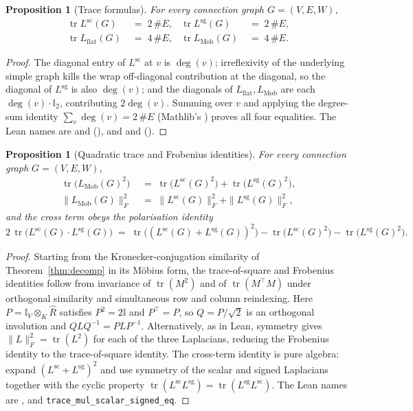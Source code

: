 \documentclass[11pt,a4paper]{amsart}
\theoremstyle{plain}
\newtheorem{proposition}[theorem]{Proposition}
\theoremstyle{definition}
\theoremstyle{remark}
\DeclareMathOperator{\tr}{tr}
\newcommand{\II}{\mathbb{I}}
\newcommand{\kronprod}{\otimes_{\!K}}
\newcommand{\Lscalar}{L^{\operatorname{sc}}}
\newcommand{\Lsigned}{L^{\operatorname{sg}}}
\begin{document}
\begin{proposition}[Trace formulas]\label{prop:traces}
For every connection graph $G=(V,E,W)$,
\begin{align*}
  \tr \Lscalar(G) \;&=\; 2\,\#E, &
  \tr \Lsigned(G) \;&=\; 2\,\#E, \\
  \tr L_{\mathrm{flat}}(G) \;&=\; 4\,\#E, &
  \tr L_{\mathrm{Mob}}(G) \;&=\; 4\,\#E.
\end{align*}
\end{proposition}

\begin{proof}
The diagonal entry of $\Lscalar$ at $v$ is
$\deg(v)$; irreflexivity of the underlying simple graph kills the
wrap off-diagonal contribution at the diagonal, so the diagonal of
$\Lsigned$ is also $\deg(v)$; and the diagonals of
$L_{\mathrm{flat}}, L_{\mathrm{Mob}}$ are each $\deg(v)\cdot\II_2$,
contributing $2\deg(v)$. Summing over $v$ and applying the
degree-sum identity
$\sum_v \deg(v) = 2\,\#E$
(Mathlib's
) proves
all four equalities. The Lean names are
 and 
(), and  and
 ().
\end{proof}

\begin{proposition}[Quadratic trace and Frobenius
identities]\label{prop:traces2}
For every connection graph $G=(V,E,W)$,
\begin{align*}
  \tr\bigl(L_{\mathrm{Mob}}(G)^2\bigr)
  \;&=\; \tr\bigl(\Lscalar(G)^2\bigr)
       + \tr\bigl(\Lsigned(G)^2\bigr), \\
  \|L_{\mathrm{Mob}}(G)\|_F^2
  \;&=\; \|\Lscalar(G)\|_F^2 + \|\Lsigned(G)\|_F^2,
\end{align*}
and the cross term obeys the polarisation identity
\[
  2\,\tr\!\bigl(\Lscalar(G)\cdot\Lsigned(G)\bigr)
  \;=\;
  \tr\!\bigl((\Lscalar(G){+}\Lsigned(G))^2\bigr)
  - \tr\!\bigl(\Lscalar(G)^2\bigr)
  - \tr\!\bigl(\Lsigned(G)^2\bigr).
\]
\end{proposition}

\begin{proof}
Starting from the Kronecker-conjugation similarity of
Theorem~\ref{thm:decomp} in its Möbius form, the trace-of-square and
Frobenius identities follow from invariance of $\tr(M^2)$ and of
$\tr(M^\top M)$ under orthogonal similarity and simultaneous row and
column reindexing. Here $P=\II_V\kronprod\widehat R$ satisfies
$P^2=2\II$ and $P^\top=P$, so $Q=P/\sqrt{2}$ is an orthogonal
involution and $QLQ^{-1}=PLP^{-1}$. Alternatively, as in Lean,
symmetry gives $\|L\|_F^2=\tr(L^2)$ for each of the three Laplacians,
reducing the Frobenius identity to the trace-of-square identity.
The cross-term identity is pure algebra: expand
$(\Lscalar+\Lsigned)^2$ and use symmetry of the scalar and signed
Laplacians together with the cyclic property
$\tr(\Lscalar\Lsigned)=\tr(\Lsigned\Lscalar)$. The Lean names are
,
 and
\texttt{trace\_mul\_scalar\_signed\_eq}.
\end{proof}
\end{document}
